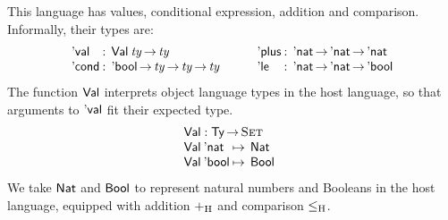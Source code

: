 This language has values, conditional
expression, addition and comparison. Informally, their types are:
%
\[
\begin{array}{l@{\::\:\:}l}
\SYMBEval            & \Val{\V{ty}} \To \V{ty} \\
\SYMBEcond           & \Ebool \To \V{ty} \To \V{ty} \To \V{ty}  \\ 
\end{array}
\qquad
\begin{array}{l@{\::\:\:}l}
\SYMBEplus           & \Enat \To \Enat \To \Enat                           \\
\SYMBEle             & \Enat \To \Enat \To \Ebool                          \\
\end{array}
\]
%
The function $\SYMBVal$ interprets object language types in the
host language, so that arguments to $\SYMBEval$ fit their
expected type.
\[\stk{
\SYMBVal : \Ty \To \Set \\
\begin{array}{@{}l@{\:\mapsto\:\:}l}
\Val{\Enat}   & \Nat \\
\Val{\Ebool}  & \Bool
\end{array}
}\]
We take $\Nat$ and $\Bool$ to represent
natural numbers and Booleans in the host language, equipped with
addition $\plusHost$ and comparison $\leHost$.

